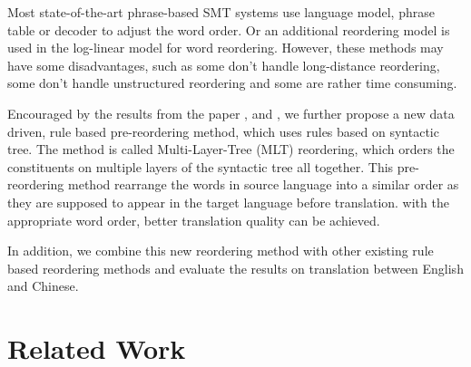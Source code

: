 Most state-of-the-art phrase-based SMT systems use language model, phrase table or decoder to adjust the word order. Or an additional reordering model is used in the log-linear model for word reordering. However, these methods may have some disadvantages, such as some don't handle long-distance reordering, some don't handle unstructured reordering and some are rather time consuming.

Encouraged by the results from the paper \cite{short}, \cite{long} and \cite{tree}, we further propose a new data driven, rule based pre-reordering method, which uses rules based on syntactic tree. The method is called Multi-Layer-Tree (MLT) reordering, which orders the constituents on multiple layers of the syntactic tree all together. This pre-reordering method rearrange the words in source language into a similar order as they are supposed to appear in the target language before translation. with the appropriate word order, better translation quality can be achieved.

In addition, we combine this new reordering method with other existing rule based reordering methods and evaluate the results on translation between English and Chinese. %


%
%
%
%
%
%



\section{Related Work}
\label{ch:Introduction:sec:RelatedWork}

